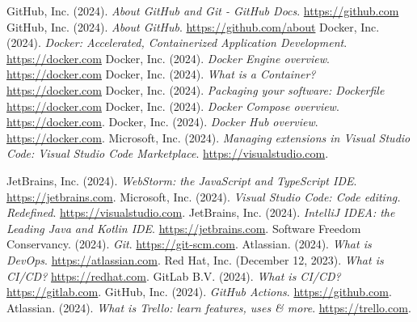\begin{thebibliography}{99}
     GitHub, Inc. (2024). \textit{About GitHub and Git - GitHub Docs}. \href{https://docs.github.com/en/get-started/start-your-journey/about-github-and-git}{https://github.com}
     GitHub, Inc. (2024). \textit{About GitHub}. \href{https://github.com/about}{https://github.com/about}
     Docker, Inc. (2024). \textit{Docker: Accelerated, Containerized Application Development}. \href{https://www.docker.com}{https://docker.com}
     Docker, Inc. (2024). \textit{Docker Engine overview}. \href{https://docs.docker.com/engine/}{https://docker.com}
     Docker, Inc. (2024). \textit{What is a Container?} \href{https://www.docker.com/resources/what-container/}{https://docker.com}
     Docker, Inc. (2024). \textit{Packaging your software: Dockerfile} \href{https://docs.docker.com/build/building/packaging/#dockerfile}{https://docker.com}
     Docker, Inc. (2024). \textit{Docker Compose overview}. \href{https://docs.docker.com/compose/}{https://docker.com}.
     Docker, Inc. (2024). \textit{Docker Hub overview}. \href{https://docs.docker.com/docker-hub/}{https://docker.com}.
     Microsoft, Inc. (2024). \textit{Managing extensions in Visual Studio Code: Visual Studio Code Marketplace}. \href{https://code.visualstudio.com/docs/editor/extension-marketplace}{https://visualstudio.com}.

     JetBrains, Inc. (2024). \textit{WebStorm: the JavaScript and TypeScript IDE}. \href{https://www.jetbrains.com/webstorm/}{https://jetbrains.com}.
     Microsoft, Inc. (2024). \textit{Visual Studio Code: Code editing. Redefined}. \href{https://code.visualstudio.com/}{https://visualstudio.com}.
     JetBrains, Inc. (2024). \textit{IntelliJ IDEA: the Leading Java and Kotlin IDE}. \href{https://www.jetbrains.com/idea/}{https://jetbrains.com}.
     Software Freedom Conservancy. (2024). \textit{Git}. \href{https://git-scm.com/about/free-and-open-source/}{https://git-scm.com}.
     Atlassian. (2024). \textit{What is DevOps}. \href{https://www.atlassian.com/devops}{https://atlassian.com}.
     Red Hat, Inc. (December 12, 2023). \textit{What is CI/CD?} \href{https://www.redhat.com/en/topics/devops/what-is-ci-cd}{https://redhat.com}.
     GitLab B.V. (2024). \textit{What is CI/CD?} \href{https://about.gitlab.com/topics/ci-cd/}{https://gitlab.com}.
     GitHub, Inc. (2024). \textit{GitHub Actions}. \href{https://github.com/features/actions/}{https://github.com}.
     Atlassian. (2024). \textit{What is Trello: learn features, uses \& more}. \href{https://trello.com/en/tour}{https://trello.com}.


\end{thebibliography}
